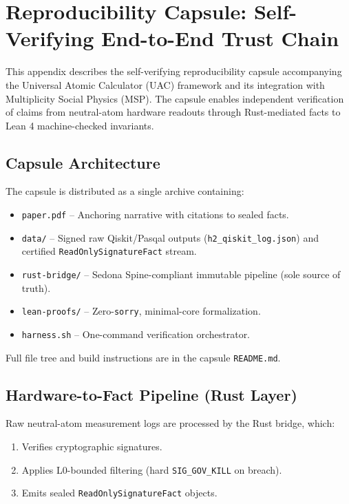\appendix
\section{Reproducibility Capsule: Self-Verifying End-to-End Trust Chain}
\label{app:capsule}

This appendix describes the self-verifying reproducibility capsule accompanying the Universal Atomic Calculator (UAC) framework and its integration with Multiplicity Social Physics (MSP). The capsule enables independent verification of claims from neutral-atom hardware readouts through Rust-mediated facts to Lean 4 machine-checked invariants.

\subsection{Capsule Architecture}
The capsule is distributed as a single archive containing:
\begin{itemize}
    \item \texttt{paper.pdf} -- Anchoring narrative with citations to sealed facts.
    \item \texttt{data/} -- Signed raw Qiskit/Pasqal outputs (\texttt{h2\_qiskit\_log.json}) and certified \texttt{ReadOnlySignatureFact} stream.
    \item \texttt{rust-bridge/} -- Sedona Spine-compliant immutable pipeline (sole source of truth).
    \item \texttt{lean-proofs/} -- Zero-\texttt{sorry}, minimal-core formalization.
    \item \texttt{harness.sh} -- One-command verification orchestrator.
\end{itemize}

Full file tree and build instructions are in the capsule \texttt{README.md}.

\subsection{Hardware-to-Fact Pipeline (Rust Layer)}
Raw neutral-atom measurement logs are processed by the Rust bridge, which:
\begin{enumerate}
    \item Verifies cryptographic signatures.
    \item Applies L0-bounded filtering (hard \texttt{SIG\_GOV\_KILL} on breach).
    \item Emits sealed \texttt{ReadOnlySignatureFact} objects.
\end{enumerate}

